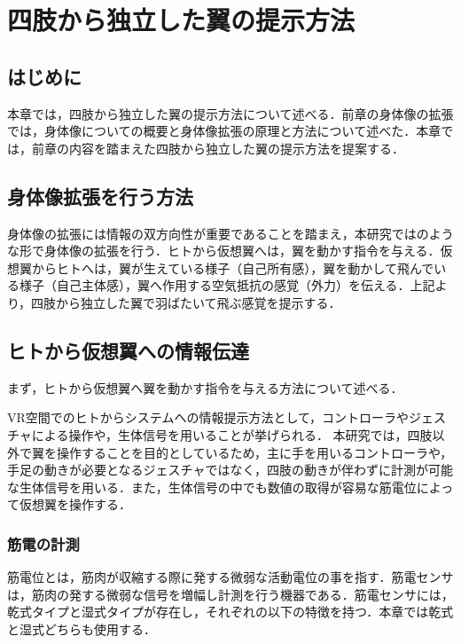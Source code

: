 \chapter[四肢から独立した翼の提示方法]%
        {四肢から独立した翼の提示方法}

\section{はじめに}
    本章では，四肢から独立した翼の提示方法について述べる．前章の身体像の拡張では，身体像についての概要と身体像拡張の原理と方法について述べた．本章では，前章の内容を踏まえた四肢から独立した翼の提示方法を提案する．


\section{身体像拡張を行う方法}
    身体像の拡張には情報の双方向性が重要であることを踏まえ，本研究ではのような形で身体像の拡張を行う．ヒトから仮想翼へは，翼を動かす指令を与える．仮想翼からヒトへは，翼が生えている様子（自己所有感），翼を動かして飛んでいる様子（自己主体感），翼へ作用する空気抵抗の感覚（外力）を伝える．上記より，四肢から独立した翼で羽ばたいて飛ぶ感覚を提示する．
    
\section{ヒトから仮想翼への情報伝達}
    まず，ヒトから仮想翼へ翼を動かす指令を与える方法について述べる．

    VR空間でのヒトからシステムへの情報提示方法として，コントローラやジェスチャによる操作や，生体信号を用いることが挙げられる．
    本研究では，四肢以外で翼を操作することを目的としているため，主に手を用いるコントローラや，手足の動きが必要となるジェスチャではなく，四肢の動きが伴わずに計測が可能な生体信号を用いる．また，生体信号の中でも数値の取得が容易な筋電位によって仮想翼を操作する．
    
    \subsection{筋電の計測}
        筋電位とは，筋肉が収縮する際に発する微弱な活動電位の事を指す．筋電センサは，筋肉の発する微弱な信号を増幅し計測を行う機器である\cite{alts-myography}．筋電センサには，乾式タイプと湿式タイプが存在し，それぞれの以下の特徴を持つ．本章では乾式と湿式どちらも使用する．

